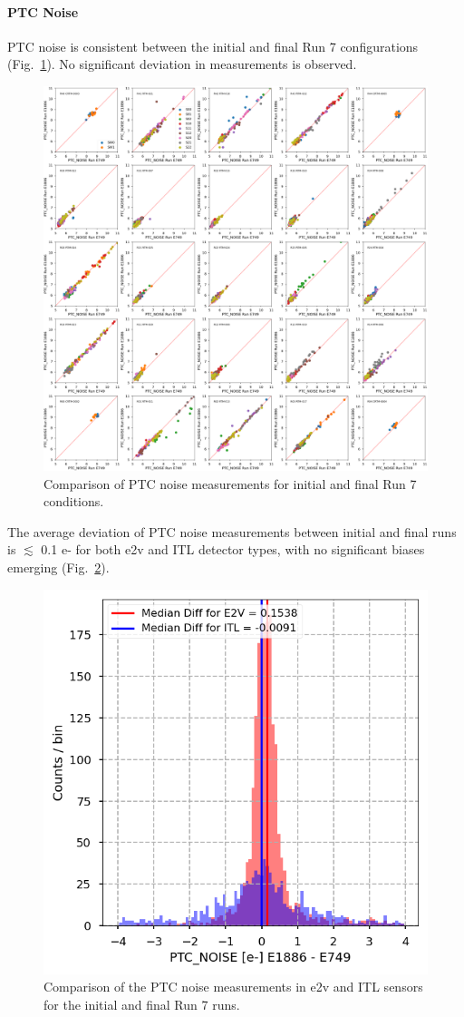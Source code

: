 \paragraph{PTC Noise}\label{sec:finalChar:PTCNoise}

PTC noise is consistent between the initial and final Run 7 configurations (Fig.~\ref{fig:finalChar-PTC_noise_5x5}). No significant deviation in measurements is observed.

\begin{figure}[ht]
    \centering
    \includegraphics[width=0.7\linewidth]{figures/finalCharacterization/E749_E1886_PTC_NOISE.png}
    \caption{Comparison of PTC noise measurements for initial and final Run 7 conditions.}
    \label{fig:finalChar-PTC_noise_5x5}
\end{figure}

The average deviation of PTC noise measurements between initial and final runs is $\lesssim$ 0.1 e- for both e2v and ITL detector types, with no significant biases emerging (Fig.~\ref{fig:finalChar:PTCNoise_diff_hist}).

\begin{figure}[ht]
    \centering
    \includegraphics[width=0.7\linewidth]{figures/finalCharacterization/PTC_NOISE_E749_E1886_diff.png}
    \caption{Comparison of the PTC noise measurements in e2v and ITL sensors for the initial and final Run 7 runs.}
    \label{fig:finalChar:PTCNoise_diff_hist}
\end{figure}

